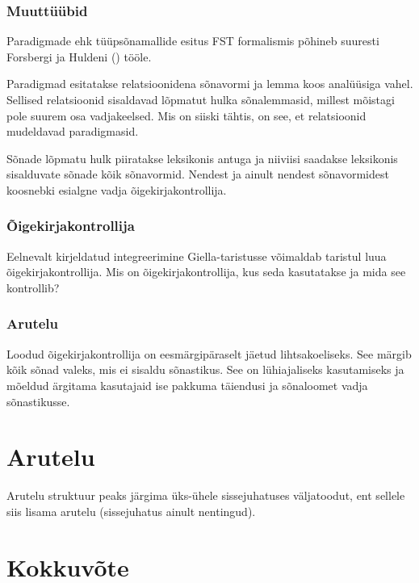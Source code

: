 \documentclass[12pt,a4paper]{article}
\begin{document}
\subsubsection{Muuttüübid}
\label{sec:giella-muuttüübid}

Paradigmade ehk tüüpsõnamallide esitus FST formalismis põhineb suuresti Forsbergi ja Huldeni (\citeyear{forsberg_learning_2016}) tööle.

Paradigmad esitatakse relatsioonidena sõnavormi ja lemma koos analüüsiga vahel. Sellised relatsioonid sisaldavad lõpmatut hulka sõnalemmasid, millest mõistagi pole suurem osa vadjakeelsed. Mis on siiski tähtis, on see, et relatsioonid mudeldavad paradigmasid.

Sõnade lõpmatu hulk piiratakse leksikonis antuga ja niiviisi saadakse leksikonis sisalduvate sõnade kõik sõnavormid. Nendest ja ainult nendest sõnavormidest koosnebki esialgne vadja õigekirja\-kontrollija.

\subsubsection{Õigekirjakontrollija}
\label{sec:giella-õigekirjakontrollija}

Eelnevalt kirjeldatud integreerimine Giella-taristusse võimaldab taristul luua õigekirjakontrollija. Mis on õigekirjakontrollija, kus seda kasutatakse ja mida see kontrollib?

\subsubsection{Arutelu}
\label{sec:giella-arutelu}

Loodud õigekirjakontrollija on eesmärgipäraselt jäetud lihtsakoeliseks. See märgib kõik sõnad valeks, mis ei sisaldu sõnastikus. See on lühiajaliseks kasutamiseks ja mõeldud ärgitama kasutajaid ise pakkuma täiendusi ja sõnaloomet vadja sõnastikusse.



\newpage
\section{Arutelu}

Arutelu struktuur peaks järgima üks-ühele sissejuhatuses väljatoodut, ent sellele siis lisama arutelu (sissejuhatus ainult nentingud).


\newpage
\section{Kokkuvõte}
\end{document}
